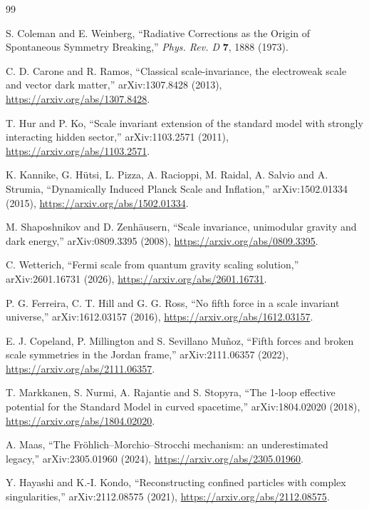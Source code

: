 \documentclass[11pt,a4paper]{article}
\begin{document}
\begin{thebibliography}{99}

S. Coleman and E. Weinberg,
``Radiative Corrections as the Origin of Spontaneous Symmetry Breaking,''
\emph{Phys. Rev. D} \textbf{7}, 1888 (1973).

C. D. Carone and R. Ramos,
``Classical scale-invariance, the electroweak scale and vector dark matter,''
arXiv:1307.8428 (2013),
\url{https://arxiv.org/abs/1307.8428}.

T. Hur and P. Ko,
``Scale invariant extension of the standard model with strongly interacting hidden sector,''
arXiv:1103.2571 (2011),
\url{https://arxiv.org/abs/1103.2571}.

K. Kannike, G. H\"utsi, L. Pizza, A. Racioppi, M. Raidal, A. Salvio and A. Strumia,
``Dynamically Induced Planck Scale and Inflation,''
arXiv:1502.01334 (2015),
\url{https://arxiv.org/abs/1502.01334}.

M. Shaposhnikov and D. Zenh\"ausern,
``Scale invariance, unimodular gravity and dark energy,''
arXiv:0809.3395 (2008),
\url{https://arxiv.org/abs/0809.3395}.

C. Wetterich,
``Fermi scale from quantum gravity scaling solution,''
arXiv:2601.16731 (2026),
\url{https://arxiv.org/abs/2601.16731}.

P. G. Ferreira, C. T. Hill and G. G. Ross,
``No fifth force in a scale invariant universe,''
arXiv:1612.03157 (2016),
\url{https://arxiv.org/abs/1612.03157}.

E. J. Copeland, P. Millington and S. Sevillano Mu\~noz,
``Fifth forces and broken scale symmetries in the Jordan frame,''
arXiv:2111.06357 (2022),
\url{https://arxiv.org/abs/2111.06357}.

T. Markkanen, S. Nurmi, A. Rajantie and S. Stopyra,
``The 1-loop effective potential for the Standard Model in curved spacetime,''
arXiv:1804.02020 (2018),
\url{https://arxiv.org/abs/1804.02020}.

A. Maas,
``The Fr\"ohlich--Morchio--Strocchi mechanism: an underestimated legacy,''
arXiv:2305.01960 (2024),
\url{https://arxiv.org/abs/2305.01960}.

Y. Hayashi and K.-I. Kondo,
``Reconstructing confined particles with complex singularities,''
arXiv:2112.08575 (2021),
\url{https://arxiv.org/abs/2112.08575}.


\end{thebibliography}
\end{document}
